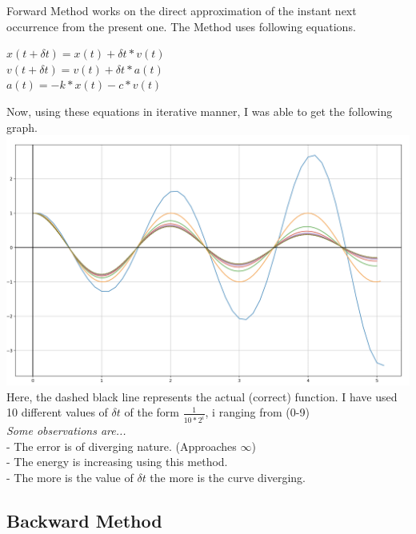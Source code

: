 \documentclass{article}
\begin{document}
        Forward Method works on the direct approximation of the instant next occurrence from the present one. The Method uses following equations.
                \begin{center}
                \(x(t+\delta t) = x(t) + \delta t*v(t)\) \\
                \(v(t+\delta t) = v(t) + \delta t*a(t)\) \\
                \(a(t) = - k*x(t) - c*v(t)\) \\
                \end{center}
        Now, using these equations in iterative manner, I was able to get the following graph. \\
        \includegraphics[scale=.25]{../Forward.png} \\
        Here, the dashed black line represents the actual (correct) function. I have used 10 different values of \(\delta t\) of the form \(\frac{1}{10 * 2^i}\), i ranging from (0-9) \\[20pt]
        \textit{Some observations are...} \\
             - The error is of diverging nature. (Approaches \(\infty\)) \\
             - The energy is increasing using this method. \\
             - The more is the value of \(\delta t\) the more is the curve diverging.
    
        \pagebreak
        \subsection*{Backward Method}
    
\end{document}
